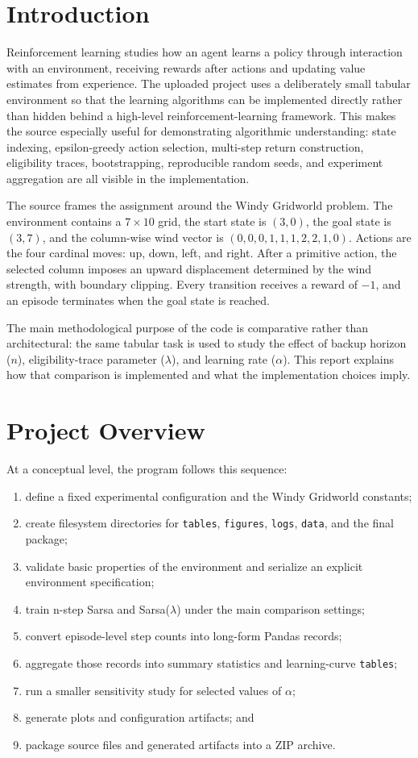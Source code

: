 \documentclass[11pt,a4paper]{article}
\begin{document}
\section{Introduction}
Reinforcement learning studies how an agent learns a policy through interaction with an environment, receiving rewards after actions and updating value estimates from experience. The uploaded project uses a deliberately small tabular environment so that the learning algorithms can be implemented directly rather than hidden behind a high-level reinforcement-learning framework. This makes the source especially useful for demonstrating algorithmic understanding: state indexing, epsilon-greedy action selection, multi-step return construction, eligibility traces, bootstrapping, reproducible random seeds, and experiment aggregation are all visible in the implementation.

The source frames the assignment around the Windy Gridworld problem. The environment contains a $7\times10$ grid, the start state is $(3,0)$, the goal state is $(3,7)$, and the column-wise wind vector is $(0,0,0,1,1,1,2,2,1,0)$. Actions are the four cardinal moves: up, down, left, and right. After a primitive action, the selected column imposes an upward displacement determined by the wind strength, with boundary clipping. Every transition receives a reward of $-1$, and an episode terminates when the goal state is reached.

The main methodological purpose of the code is comparative rather than architectural: the same tabular task is used to study the effect of backup horizon ($n$), eligibility-trace parameter ($\lambda$), and learning rate ($\alpha$). This report explains how that comparison is implemented and what the implementation choices imply.

\section{Project Overview}
At a conceptual level, the program follows this sequence:

\begin{enumerate}
\item define a fixed experimental configuration and the Windy Gridworld constants;
\item create filesystem directories for \texttt{tables}, \texttt{figures}, \texttt{logs}, \texttt{data}, and the final package;
\item validate basic properties of the environment and serialize an explicit environment specification;
\item train n-step Sarsa and Sarsa($\lambda$) under the main comparison settings;
\item convert episode-level step counts into long-form Pandas records;
\item aggregate those records into summary statistics and learning-curve \texttt{tables};
\item run a smaller sensitivity study for selected values of $\alpha$;
\item generate plots and configuration artifacts; and
\item package source files and generated artifacts into a ZIP archive.
\end{enumerate}
\end{document}
